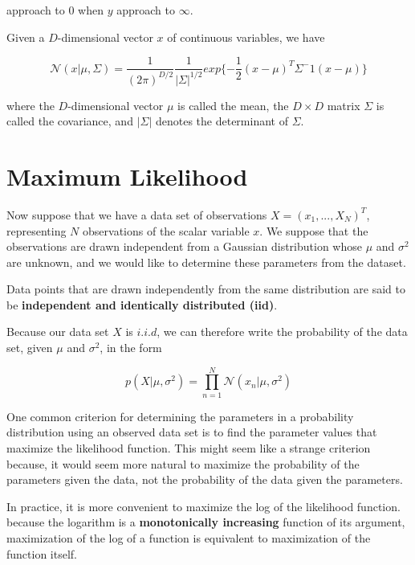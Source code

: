 approach to $0$ when $y$ approach to $\infty$.

Given a $D$-dimensional vector $x$ of continuous variables, we have

\begin{equation}
    \mathcal{N}(x | \mu, \Sigma) = \frac{1}{(2\pi)^{D/2}} \frac{1}{|\Sigma|^{1/2}}exp\{-\frac{1}{2}(x - \mu)^T\Sigma^-1(x - \mu)\}
\end{equation}

where the $D$-dimensional vector $\mu$ is called the mean, the $D \times D$ matrix $\Sigma$ is called the covariance, and $|\Sigma|$ denotes the determinant of $\Sigma$.

\section{Maximum Likelihood}

Now suppose that we have a data set of observations $X = (x_1, ..., X_N)^T$, representing $N$ observations of the scalar variable $x$. We suppose that the observations are drawn independent from a Gaussian distribution whose $\mu$ and $\sigma^2$ are unknown, and we would like to determine these parameters from the dataset.

Data points that are drawn independently from the same distribution are said to be \textbf{independent and identically distributed (iid)}.

Because our data set $X$ is $i.i.d$, we can therefore write the probability of the data set, given $\mu$ and $\sigma^2$, in the form

\begin{equation}
    p(X|\mu, \sigma^2) = \prod_{n=1}^N \mathcal{N}(x_n|\mu, \sigma^2)
\end{equation}

One common criterion for determining the parameters in a probability distribution using an observed data set is to find the parameter values that maximize the likelihood function. This might seem like a strange criterion because, it would seem more natural to maximize the probability of the parameters given the data, not the probability of the data given the parameters.

In practice, it is more convenient to maximize the log of the likelihood function. because the logarithm is a \textbf{monotonically increasing} function of its argument, maximization of the log of a function is equivalent to maximization of the function itself.

